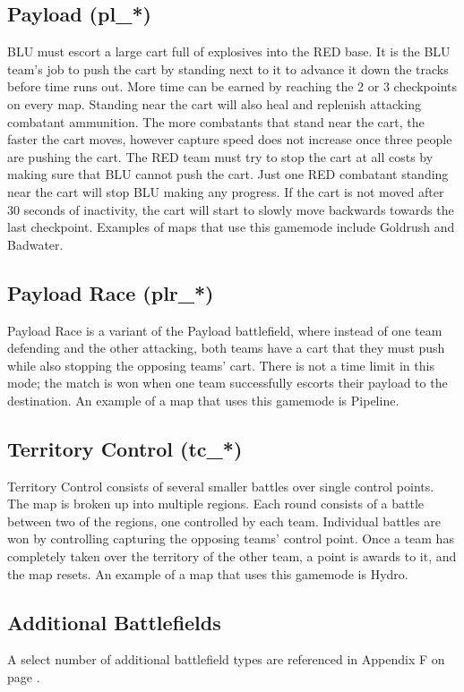 \subsection{Payload (pl\_*)}
BLU must escort a large cart full of explosives into the RED base. It is the BLU team's job to push the cart by standing next to it to advance it down the tracks before time runs out. More time can be earned by reaching the 2 or 3 checkpoints on every map. Standing near the cart will also heal and replenish attacking combatant ammunition. The more combatants that stand near the cart, the faster the cart moves, however capture speed does not increase once three people are pushing the cart. The RED team must try to stop the cart at all costs by making sure that BLU cannot push the cart. Just one RED combatant standing near the cart will stop BLU making any progress. If the cart is not moved after 30 seconds of inactivity, the cart will start to slowly move backwards towards the last checkpoint. Examples of maps that use this gamemode include Goldrush and Badwater.

\subsection{Payload Race (plr\_*)}
Payload Race is a variant of the Payload battlefield, where instead of one team defending and the other attacking, both teams have a cart that they must push while also stopping the opposing teams’ cart. There is not a time limit in this mode; the match is won when one team successfully escorts their payload to the destination. An example of a map that uses this gamemode is Pipeline.

\subsection{Territory Control (tc\_*)}
Territory Control consists of several smaller battles over single control points.  The map is broken up into multiple regions.  Each round consists of a battle between two of the regions, one controlled by each team. Individual battles are won by controlling capturing the opposing teams' control point.  Once a team has completely taken over the territory of the other team, a point is awards to it, and the map resets. An example of a map that uses this gamemode is Hydro.

\subsection{Additional Battlefields}
A select number of additional battlefield types are referenced in Appendix F on page \pageref{Additional_Battlefields}.